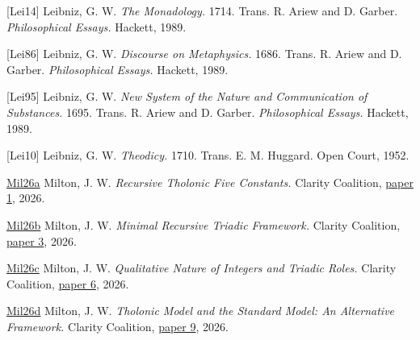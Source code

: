 \documentclass[12pt]{article}
\begin{document}
{[}Lei14{]} Leibniz, G. W. \emph{The Monadology.} 1714. Trans. R. Ariew
and D. Garber. \emph{Philosophical Essays.} Hackett, 1989.

{[}Lei86{]} Leibniz, G. W. \emph{Discourse on Metaphysics.} 1686. Trans.
R. Ariew and D. Garber. \emph{Philosophical Essays.} Hackett, 1989.

{[}Lei95{]} Leibniz, G. W. \emph{New System of the Nature and
Communication of Substances.} 1695. Trans. R. Ariew and D. Garber.
\emph{Philosophical Essays.} Hackett, 1989.

{[}Lei10{]} Leibniz, G. W. \emph{Theodicy.} 1710. Trans. E. M. Huggard.
Open Court, 1952.

\href{https://github.com/baardev/truevalue/blob/main/docnav/Research/papers/1_recursive-tholonic-five-constants/1_recursive-tholonic-five-constants.pdf}{Mil26a}
Milton, J. W. \emph{Recursive Tholonic Five Constants.} Clarity
Coalition,
\href{https://github.com/baardev/truevalue/blob/main/docnav/Research/papers/1_recursive-tholonic-five-constants/1_recursive-tholonic-five-constants.pdf}{paper
1}, 2026.

\href{https://github.com/baardev/truevalue/blob/main/docnav/Research/papers/3_minimal-recursive-triadic-framework/3_minimal-recursive-triadic-framework.pdf}{Mil26b}
Milton, J. W. \emph{Minimal Recursive Triadic Framework.} Clarity
Coalition,
\href{https://github.com/baardev/truevalue/blob/main/docnav/Research/papers/3_minimal-recursive-triadic-framework/3_minimal-recursive-triadic-framework.pdf}{paper
3}, 2026.

\href{https://github.com/baardev/truevalue/blob/main/docnav/Research/papers/6_qualitative-nature-integers-triadic-roles/6_qualitative-nature-integers-triadic-roles.pdf}{Mil26c}
Milton, J. W. \emph{Qualitative Nature of Integers and Triadic Roles.}
Clarity Coalition,
\href{https://github.com/baardev/truevalue/blob/main/docnav/Research/papers/6_qualitative-nature-integers-triadic-roles/6_qualitative-nature-integers-triadic-roles.pdf}{paper
6}, 2026.

\href{https://github.com/baardev/truevalue/blob/main/docnav/Research/papers/9_tholonic-model-standard-model-alternative/9_tholonic-model-standard-model-alternative.pdf}{Mil26d}
Milton, J. W. \emph{Tholonic Model and the Standard Model: An
Alternative Framework.} Clarity Coalition,
\href{https://github.com/baardev/truevalue/blob/main/docnav/Research/papers/9_tholonic-model-standard-model-alternative/9_tholonic-model-standard-model-alternative.pdf}{paper
9}, 2026.
\end{document}
